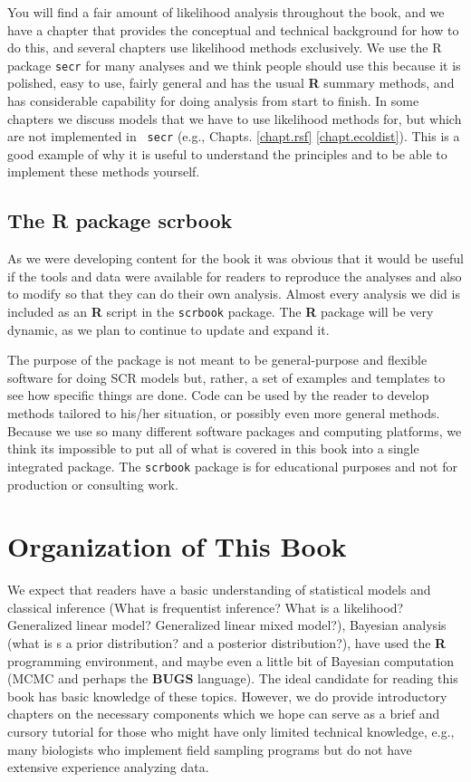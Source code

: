 You will find a fair amount of likelihood analysis throughout the book,
 and we have a chapter that
provides the conceptual and technical background for how to do this,
and several chapters use likelihood methods exclusively. We use the R
package \mbox{\tt secr} \citep{efford_etal:2009euring} for many
analyses and we think people should use this because it is polished,
easy to use, fairly general and has the usual {\bf R} summary methods,
and has considerable capability for doing analysis from start to
finish. In some chapters we discuss models that we have to use
likelihood methods for, but which are not implemented in \mbox{\tt
  secr} (e.g., Chapts. \ref{chapt.rsf} \ref{chapt.ecoldist}). This is
a good example of why it is useful to understand the principles and to
be able to implement these methods yourself.

\subsection*{The R package scrbook}

As we were developing content for the book it was obvious that it
would be useful if the tools and data were available for
readers to reproduce the analyses and also to modify so that they can
do their own analysis.  Almost every analysis we did is included as an
{\bf R} script in the \mbox{\tt scrbook} package.
The {\bf R} package will be very dynamic, as we plan to
continue to update and expand it.

The purpose of the package is not meant to be general-purpose and
flexible software for doing SCR models but, rather, a set of examples
and templates to see how specific things are done. Code can be used
by the reader to develop methods tailored to his/her situation, or
possibly even more general methods.  Because we use so many different
software packages and computing platforms, we think its impossible to
put all of what is covered in this book into a single integrated
package.  The \mbox{\tt scrbook} package is for educational purposes
and not for production or consulting work.


\section*{Organization of This Book}

We expect that readers have a basic understanding of statistical
models and classical inference (What is frequentist inference? What is
a likelihood? Generalized linear model? Generalized linear mixed
model?), Bayesian analysis (what is s a prior distribution? and a
posterior distribution?), have used the {\bf R} programming
environment, and maybe even a little bit of Bayesian computation (MCMC
and perhaps the \textbf{BUGS} language).  The ideal candidate for
reading this book has basic knowledge of these topics. However, we do
provide introductory chapters on the necessary components which we
hope can serve as a brief and cursory tutorial for those who might
have only limited technical knowledge, e.g., many biologists who
implement field sampling programs but do not have extensive experience
analyzing data.


